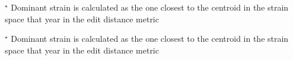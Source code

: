 \begin{table}[!ht]\centering
{}\label{tabrec4}

\sffamily\fontsize{7}{8}\selectfont


\flushleft

\fontsize{8}{8}\selectfont
$^\star$ Dominant strain is calculated as the one closest to the centroid in the strain space that year in the edit distance metric


\end{table}


\begin{table}[!ht]\centering
{}\label{tabrec5}

\sffamily\fontsize{7}{8}\selectfont


\flushleft

\fontsize{7}{7}\selectfont
$^\star$ Dominant strain is calculated as the one closest to the centroid in the strain space that year in the edit distance metric
\end{table}

\clearpage

